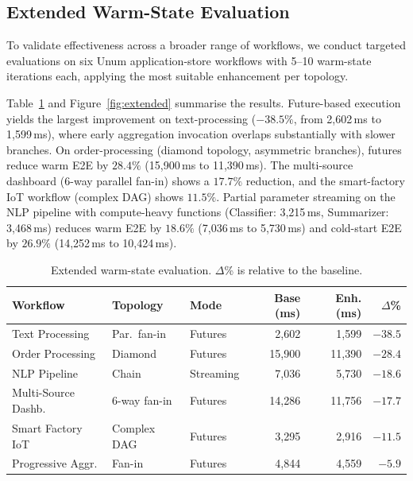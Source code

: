 \documentclass[runningheads]{llncs}
\begin{document}
\subsection{Extended Warm-State Evaluation}
\label{sec:extended}

To validate effectiveness across a broader range of workflows, we conduct targeted evaluations on six Unum application-store workflows with 5--10 warm-state iterations each, applying the most suitable enhancement per topology.

Table~\ref{tab:extended} and Figure~\ref{fig:extended} summarise the results. Future-based execution yields the largest improvement on text-processing ($-38.5\%$, from 2,602\,ms to 1,599\,ms), where early aggregation invocation overlaps substantially with slower branches. On order-processing (diamond topology, asymmetric branches), futures reduce warm E2E by $28.4\%$ (15,900\,ms to 11,390\,ms). The multi-source dashboard (6-way parallel fan-in) shows a $17.7\%$ reduction, and the smart-factory IoT workflow (complex DAG) shows $11.5\%$. Partial parameter streaming on the NLP pipeline with compute-heavy functions (Classifier: 3,215\,ms, Summarizer: 3,468\,ms) reduces warm E2E by $18.6\%$ (7,036\,ms to 5,730\,ms) and cold-start E2E by $26.9\%$ (14,252\,ms to 10,424\,ms).

\begin{table}
\caption{Extended warm-state evaluation. $\Delta$\% is relative to the baseline.}
\label{tab:extended}
\begin{tabular}{|l|l|l|r|r|r|}
\hline
\textbf{Workflow} & \textbf{Topology} & \textbf{Mode} & \textbf{Base (ms)} & \textbf{Enh. (ms)} & \textbf{$\Delta$\%} \\
\hline
Text Processing       & Par.\ fan-in     & Futures   & 2,602  & 1,599  & $-38.5$ \\
Order Processing      & Diamond          & Futures   & 15,900 & 11,390 & $-28.4$ \\
NLP Pipeline          & Chain            & Streaming & 7,036  & 5,730  & $-18.6$ \\
Multi-Source Dashb.   & 6-way fan-in     & Futures   & 14,286 & 11,756 & $-17.7$ \\
Smart Factory IoT     & Complex DAG      & Futures   & 3,295  & 2,916  & $-11.5$ \\
Progressive Aggr.     & Fan-in           & Futures   & 4,844  & 4,559  & $-5.9$ \\
\hline
\end{tabular}
\end{table}
\end{document}
